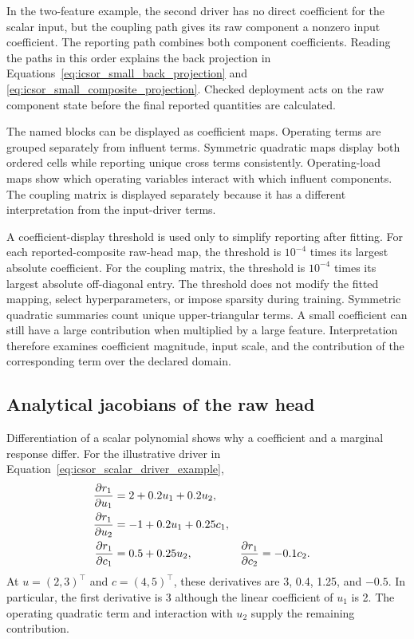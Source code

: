 In the two-feature example, the second driver has no direct coefficient for the scalar input, but the coupling path gives its raw component a nonzero input coefficient. The reporting path combines both component coefficients. Reading the paths in this order explains the back projection in Equations~\eqref{eq:icsor_small_back_projection} and \eqref{eq:icsor_small_composite_projection}. Checked deployment acts on the raw component state before the final reported quantities are calculated.

The named blocks can be displayed as coefficient maps. Operating terms are grouped separately from influent terms. Symmetric quadratic maps display both ordered cells while reporting unique cross terms consistently. Operating-load maps show which operating variables interact with which influent components. The coupling matrix is displayed separately because it has a different interpretation from the input-driver terms.

A coefficient-display threshold is used only to simplify reporting after fitting. For each reported-composite raw-head map, the threshold is \(10^{-4}\) times its largest absolute coefficient. For the coupling matrix, the threshold is \(10^{-4}\) times its largest absolute off-diagonal entry. The threshold does not modify the fitted mapping, select hyperparameters, or impose sparsity during training. Symmetric quadratic summaries count unique upper-triangular terms. A small coefficient can still have a large contribution when multiplied by a large feature. Interpretation therefore examines coefficient magnitude, input scale, and the contribution of the corresponding term over the declared domain.

\subsection{Analytical jacobians of the raw head}

Differentiation of a scalar polynomial shows why a coefficient and a marginal response differ. For the illustrative driver in Equation~\eqref{eq:icsor_scalar_driver_example},
\begin{equation}
\equationname{Gradients of the illustrative scalar regression driver}
\label{eq:icsor_scalar_driver_derivatives}
\begin{aligned}
\frac{\partial r_1}{\partial u_1}&=2+0.2u_1+0.2u_2,\\
\frac{\partial r_1}{\partial u_2}&=-1+0.2u_1+0.25c_1,\\
\frac{\partial r_1}{\partial c_1}&=0.5+0.25u_2,
&\frac{\partial r_1}{\partial c_2}&=-0.1c_2.
\end{aligned}
\end{equation}
At \(u=(2,3)^\top\) and \(c=(4,5)^\top\), these derivatives are 3, 0.4, 1.25, and \(-0.5\). In particular, the first derivative is 3 although the linear coefficient of \(u_1\) is 2. The operating quadratic term and interaction with \(u_2\) supply the remaining contribution.

